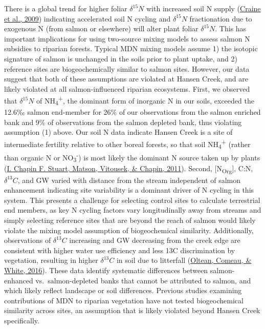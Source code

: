 \documentclass [11pt, proquest] {uwthesis}[2015/03/03]
\begin{document}
There is a global trend for higher foliar \(\delta^{15}N\) with increased soil N supply (\protect\hyperlink{ref-Craine2009}{Craine et al., 2009}) indicating accelerated soil N cycling and \(\delta^{15}N\) fractionation due to exogenous N (from salmon or elsewhere) will alter plant foliar \(\delta^{15}N\). This has important implications for using two-source mixing models to assess salmon N subsidies to riparian forests. Typical MDN mixing models assume 1) the isotopic signature of salmon is unchanged in the soils prior to plant uptake, and 2) reference sites are biogeochemically similar to salmon sites. However, our data suggest that both of these assumptions are violated at Hansen Creek, and are likely violated at all salmon-influenced riparian ecosystems. First, we observed that \(\delta^{15}N\) of NH\textsubscript{4}\textsuperscript{+}, the dominant form of inorganic N in our soils, exceeded the 12.6‰ salmon end-member for 26\% of our observations from the salmon enriched bank and 9\% of observations from the salmon depleted bank, thus violating assumption (1) above. Our soil N data indicate Hansen Creek is a site of intermediate fertility relative to other boreal forests, so that soil NH\textsubscript{4}\textsuperscript{+} (rather than organic N or NO\textsubscript{3}\textsuperscript{-}) is most likely the dominant N source taken up by plants (\protect\hyperlink{ref-Chapin2011}{I. Chapin F. Stuart, Matson, Vitousek, \& Chapin, 2011}). Second, {[}N\textsubscript{Org}{]}, C:N, \(\delta^{13}C\), and GW varied with distance from the stream independent of salmon enhancement indicating site variability is a dominant driver of N cycling in this system. This presents a challenge for selecting control sites to calculate terrestrial end members, as key N cycling factors vary longitudinally away from streams and simply selecting reference sites that are beyond the reach of salmon would likely violate the mixing model assumption of biogeochemical similarity. Additionally, observations of \(\delta^{13}C\) increasing and GW decreasing from the creek edge are consistent with higher water use efficiency and less 13C discrimination by vegetation, resulting in higher \(\delta^{13}C\) in soil due to litterfall (\protect\hyperlink{ref-Oltean2016}{Oltean, Comeau, \& White, 2016}). These data identify systematic differences between salmon-enhanced vs.~salmon-depleted banks that cannot be attributed to salmon, and which likely reflect landscape or soil differences. Previous studies examining contributions of MDN to riparian vegetation have not tested biogeochemical similarity across sites, an assumption that is likely violated beyond Hansen Creek specifically.
\end{document}
